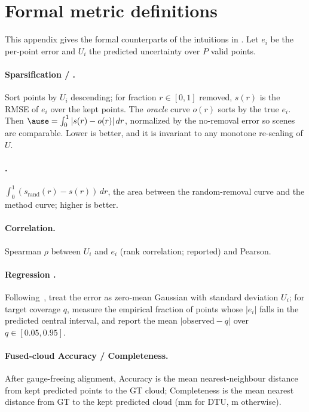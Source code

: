 \section{Formal metric definitions}
\label{app:metrics}

This appendix gives the formal counterparts of the intuitions in . Let $e_i$
be the per-point error and $U_i$ the predicted uncertainty over $P$ valid points.

\paragraph{Sparsification / \ause.} Sort points by $U_i$ descending; for fraction $r\in[0,1]$ removed,
$s(r)$ is the RMSE of $e_i$ over the kept points. The \emph{oracle} curve $o(r)$ sorts by the true
$e_i$. Then $\ause = \int_0^1 |s(r)-o(r)|\,dr$, normalized by the no-removal error so scenes are
comparable. Lower is better, and it is invariant to any monotone re-scaling of $U$.

\paragraph{\aurg.} $\int_0^1 (s_{\mathrm{rand}}(r)-s(r))\,dr$, the area between the random-removal
curve and the method curve; higher is better.

\paragraph{Correlation.} Spearman $\rho$ between $U_i$ and $e_i$ (rank correlation; reported) and
Pearson.

\paragraph{Regression \ece.} Following~\cite{kuleshov}, treat the error as zero-mean Gaussian with
standard deviation $U_i$; for target coverage $q$, measure the empirical fraction of points whose
$|e_i|$ falls in the predicted central interval, and report the mean $|\text{observed}-q|$ over
$q\in[0.05,0.95]$.

\paragraph{Fused-cloud Accuracy / Completeness.} After gauge-freeing alignment, Accuracy is the mean
nearest-neighbour distance from kept predicted points to the GT cloud; Completeness is the mean
nearest distance from GT to the kept predicted cloud (mm for DTU, m otherwise).

